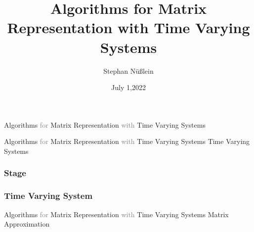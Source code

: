 \documentclass{beamer}
\title{Algorithms for Matrix Representation with Time Varying Systems}
\author{Stephan Nüßlein}
\date{July 1,2022}
\institute
{
  Lehrstuhl für Datenverarbeitung\\
}
\subtitle{}
\newcommand{\chapterpage}[1]{
	{\small 
	\textcolor{tumcolor-blue}{Algorithms} 
	\textcolor{gray}{for} 
	\textcolor{tumcolor-blue}{Matrix Representation} 
	\textcolor{gray}{with} 
	\textcolor{tumcolor-blue}{Time Varying Systems}
}
\newline
\phantom{\Huge\emph{} H}
\newline
{\LARGE \textcolor{tumcolor-blue}{#1}}
}
\begin{document}
\begin{frame}
	\titlepage
\end{frame}


\begin{frame}
	\chapterpage{\phantom{Time Varying Systems}}
\end{frame}


\begin{frame}
	\chapterpage{Time Varying Systems}
\end{frame}


\begin{frame}
	\frametitle{Stage}
	\centering
	
\end{frame}

\begin{frame}
	\frametitle{Time Varying System}
	\centering
	\scalebox{0.8}{}
\end{frame}

\begin{frame}
	\chapterpage{Matrix Approximation}
\end{frame}
\end{document}
